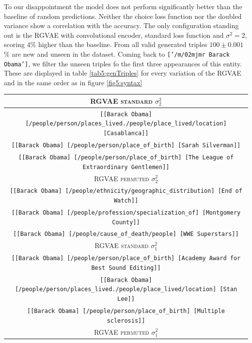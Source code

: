 To our disappointment the model does not perform significantly better than the baseline of random predictions. Neither the choice loss function nor the doubled variance show a correlation with the accuracy. The only configuration standing out is the RGVAE with convolutional encoder, standard loss function and $\sigma^2=2$, scoring $4$\% higher than the baseline. From all valid generated triples $100\pm 0.001$\% are new and unseen in the dataset. Coming back to \texttt{['/m/02mjmr Barack Obama']}, we filter the unseen triples fo the first three appearances of this entity. These are displayed in table \ref{tab5:genTriples} for every variation of the RGVAE and in the same order as in figure \ref{fig5:syntax} 



\begin{table}[H]
  \begin{tabular}{|c|}
  \hline
  \rowcolor[HTML]{EFEFEF} 
  \textsc{RGVAE standard} $\sigma_2^2$\\ \hline
  \texttt{[[Barack Obama]	[/people/person/places\_lived./people/place\_lived/location]	[Casablanca]]}\\
  \texttt{[[Barack Obama]	[/people/person/place\_of\_birth]	[Sarah Silverman]]}\\
  \texttt{[[Barack Obama]	[/people/person/place\_of\_birth]	[The League of Extraordinary Gentlemen]]}\\ \hline
  \rowcolor[HTML]{EFEFEF} 
  \textsc{RGVAE permuted} $\sigma_2^2$\\ \hline
  \texttt{[[Barack Obama]	[/people/ethnicity/geographic\_distribution]	[End of Watch]]}\\
  \texttt{[[Barack Obama]	[/people/profession/specialization\_of]	[Montgomery County]]}\\
  \texttt{[[Barack Obama]	[/people/cause\_of\_death/people]	[WWE Superstars]]}\\ \hline
  \rowcolor[HTML]{EFEFEF} 
  \textsc{RGVAE standard} $\sigma_1^2$\\ \hline
  \texttt{[[Barack Obama]	[/people/person/place\_of\_birth]	[Academy Award for Best Sound Editing]]}\\
  \texttt{[[Barack Obama]	[/people/person/places\_lived./people/place\_lived/location]	[Stan Lee]]}\\
  \texttt{[[Barack Obama]	[/people/person/place\_of\_birth]	[Multiple sclerosis]]}\\ \hline
  \rowcolor[HTML]{EFEFEF} 
  \textsc{RGVAE permuted} $\sigma_1^2$\\ \hline

\end{tabular}
\end{table}

